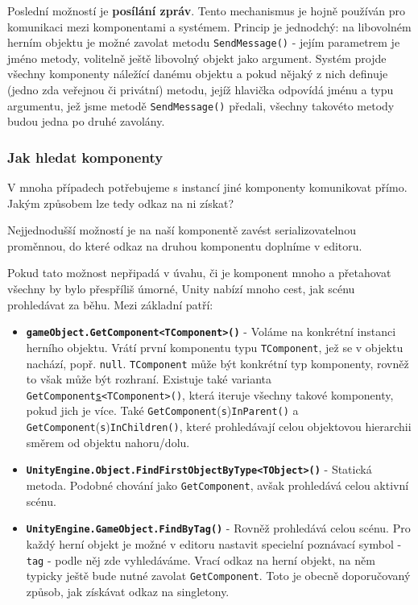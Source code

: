 Poslední možností je \textbf{posílání zpráv}. Tento mechanismus je hojně používán pro komunikaci mezi komponentami a systémem. Princip je jednodchý: na libovolném herním objektu je možné zavolat metodu \texttt{SendMessage()} - jejím parametrem je jméno metody, volitelně ještě libovolný objekt jako argument. Systém projde všechny komponenty náležící danému objektu a pokud nějaký z nich definuje (jedno zda veřejnou či privátní) metodu, jejíž hlavička odpovídá jménu a typu argumentu, jež jsme metodě \texttt{SendMessage()} předali, všechny takovéto metody budou jedna po druhé zavolány.

\subsubsection*{Jak hledat komponenty} \label{howToSearchForComponentsSubsubsection}

V mnoha případech potřebujeme s instancí jiné komponenty komunikovat přímo. Jakým způsobem lze tedy odkaz na ni získat?

Nejjednodušší možností je na naší komponentě zavést serializovatelnou proměnnou, do které odkaz na druhou komponentu doplníme v editoru. 

Pokud tato možnost nepřipadá v úvahu, či je komponent mnoho a přetahovat všechny by bylo přespříliš úmorné, Unity nabízí mnoho cest, jak scénu prohledávat za běhu. Mezi základní patří:

\begin{itemize}
    \item \textbf{\texttt{gameObject.GetComponent<TComponent>()}} - Voláme na konkrétní instanci herního objektu. Vrátí první komponentu typu \texttt{TComponent}, jež se v objektu nachází, popř. \texttt{null}. \texttt{TComponent} může být konkrétní typ komponenty, rovněž to však může být rozhraní. Existuje také varianta \texttt{GetComponent\underline{s}<TComponent>()}, která iteruje všechny takové komponenty, pokud jich je více. Také \texttt{GetComponent}(\texttt{s})\texttt{InParent()} a \texttt{GetComponent}(\texttt{s})\texttt{InChildren()}, které prohledávají celou objektovou hierarchii směrem od objektu nahoru/dolu.
    \item \textbf{\texttt{UnityEngine.Object.FindFirstObjectByType<TObject>()}} - Statická metoda. Podobné chování jako \texttt{GetComponent}, avšak prohledává celou aktivní scénu. 
    \item \textbf{\texttt{UnityEngine.GameObject.FindByTag()}} - Rovněž prohledává celou scénu. Pro každý herní objekt je možné v editoru nastavit specielní poznávací symbol - \texttt{tag} - podle něj zde vyhledáváme. Vrací odkaz na herní objekt, na něm typicky ještě bude nutné zavolat \texttt{GetComponent}. Toto je obecně doporučovaný způsob, jak získávat odkaz na singletony.
\end{itemize}

